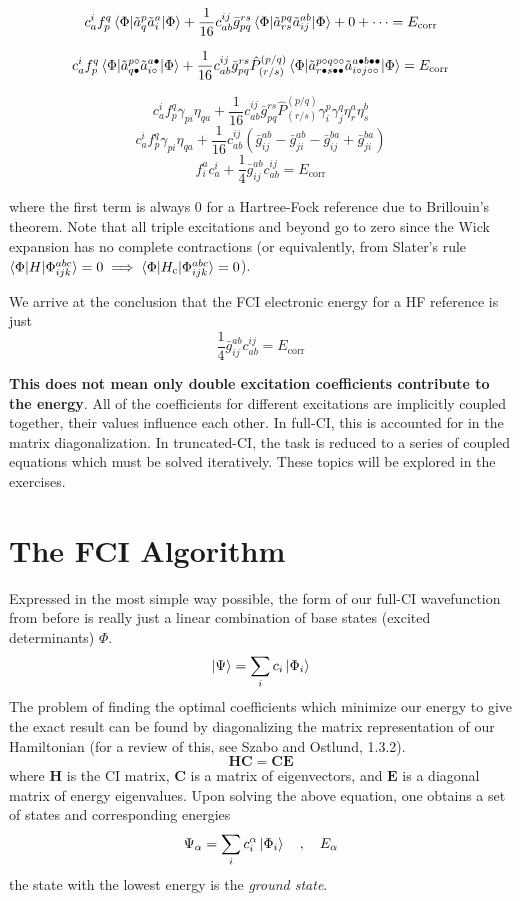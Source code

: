 \documentclass{article}
\newcommand{\lp}{\left(}
\newcommand{\rp}{\right)}
\newcommand{\h}{\circ}
\newcommand{\p}{\bullet}
\newcommand{\Ecorr}{E_{\mathrm{corr}}}
\newcommand{\Hc}{H_{\mathrm{c}}}
\begin{document}
\[ c_a^i f_p^q \braket{\Phi| \tilde{a}_{q}^{p} \tilde{a}_{i}^{a} |\Phi} + \frac{1}{16} c_{ab}^{ij} \bar{g}_{pq}^{rs} \braket{\Phi| \tilde{a}_{rs}^{pq} \tilde{a}_{ij}^{ab} | \Phi} + 0 + \cdots = \Ecorr \]

\[ c_a^i f_p^q \braket{\Phi| \tilde{a}_{q \p}^{p \h} \tilde{a}_{i \h}^{a \p} |\Phi} + 
   \frac{1}{16} c_{ab}^{ij} \bar{g}_{pq}^{rs} \hat{P}_{(r/s)}^{(p/q)} \braket{\Phi| \tilde{a}_{r \p s \p \p}^{p \h q \h \h} \tilde{a}_{i \h j \h \h}^{a \p b \p \p} | \Phi} = \Ecorr \]

\[ c_a^i f_p^q \gamma_{pi} \eta_{qa} + \frac{1}{16} c_{ab}^{ij} \bar{g}_{pq}^{rs} \hat{P}_{(r/s)}^{(p/q)} \gamma_i^p \gamma_j^q \eta_r^a \eta_s^b \]
\[ c_a^i f_p^q \gamma_{pi} \eta_{qa} + \frac{1}{16} c_{ab}^{ij}  \lp \bar{g}_{ij}^{ab} - \bar{g}_{ji}^{ab} - \bar{g}_{ij}^{ba} + \bar{g}_{ji}^{ba}  \rp\]
\[ f_i^a c_a^i + \frac{1}{4} \bar{g}_{ij}^{ab} c_{ab}^{ij} = \Ecorr \]

where the first term is always 0 for a Hartree-Fock reference due to Brillouin's theorem. 
Note that all triple excitations and beyond go to zero since the Wick expansion has no complete contractions 
(or equivalently, from Slater's rule $\braket{\Phi | H | \Phi_{ijk}^{abc}} = 0  \implies \braket{\Phi | \Hc | \Phi_{ijk}^{abc}} = 0 $).

We arrive at the conclusion that the FCI electronic energy for a HF reference is just
\[ \frac{1}{4} \bar{g}_{ij}^{ab} c_{ab}^{ij} = \Ecorr \]

\textbf{This does not mean only double excitation coefficients contribute to the energy}.
All of the coefficients for different excitations are implicitly coupled together, their values influence each other. 
In full-CI, this is accounted for in the matrix diagonalization.
In truncated-CI, the task is reduced to a series of coupled equations which must be solved iteratively. 
These topics will be explored in the exercises.

\section{The FCI Algorithm} 
Expressed in the most simple way possible, the form of our full-CI wavefunction from before is really
just a linear combination of base states (excited determinants) $\Phi$.
\[ \ket{\Psi} = \sum_i c_i \ket{\Phi_i} \]
The problem of finding the optimal coefficients which minimize our energy to give the exact result can be found by diagonalizing the 
matrix representation of our Hamiltonian (for a review of this, see Szabo and Ostlund, 1.3.2).
\[\mathbf{HC} = \mathbf{CE}\]
where  $\mathbf{H}$ is the CI matrix, $\mathbf{C}$ is a matrix of eigenvectors, and $\mathbf{E}$ is a diagonal matrix of energy eigenvalues.
Upon solving the above equation, one obtains a set of states and corresponding energies
\[ \Psi_\alpha = \sum_i c_i^\alpha \ket{\Phi_i} \quad , \quad E_\alpha \]
the state with the lowest energy is the \textit{ground state}.
\end{document}
